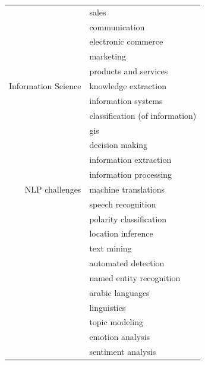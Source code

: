 \begin{center}
\begin{longtable}{ rl }
                                & sales                           \\
                                & communication                   \\
                                & electronic commerce             \\
                                & marketing                       \\
                                & products and services           \\
        Information Science     & knowledge extraction            \\
                                & information systems             \\
                                & classification (of information) \\
                                & gis                             \\
                                & decision making                 \\
                                & information extraction          \\
                                & information processing          \\
        NLP challenges          & machine translations            \\
                                & speech recognition              \\
                                & polarity classification         \\
                                & location inference              \\
                                & text mining                     \\
                                & automated detection             \\
                                & named entity recognition        \\
                                & arabic languages                \\
                                & linguistics                     \\
                                & topic modeling                  \\
                                & emotion analysis                \\
                                & sentiment analysis              \\

\end{longtable}
\end{center}
